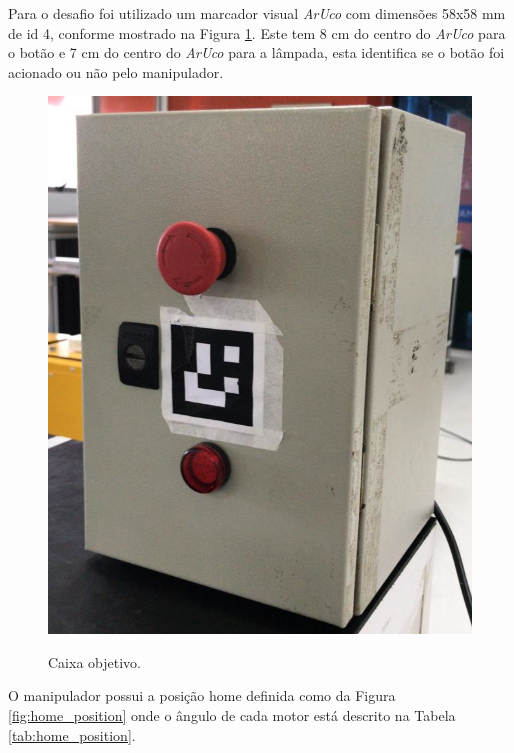 Para o desafio foi utilizado um marcador visual \textit{ArUco} com dimensões 58x58 mm de id 4, conforme mostrado na Figura \ref{fig:box-real}. Este tem 8 cm do centro do \textit{ArUco} para o botão e 7 cm do centro do \textit{ArUco} para a lâmpada, esta identifica se o botão foi acionado ou não pelo manipulador. 

\begin{figure}[H]
    \centering
    \caption{Caixa objetivo.}
    \includegraphics[scale=1.8]{images/box-real.png}
    \label{fig:box-real}
\end{figure}



O manipulador possui a posição home definida como da Figura \ref{fig:home_position} onde o ângulo de cada motor está descrito na Tabela \ref{tab:home_position}.

